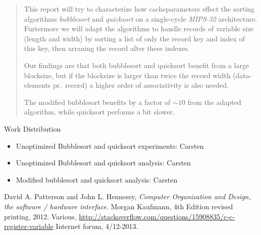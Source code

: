 



\begin{abstract}
This report will try to characterize how cacheparameters effect the sorting
algorithms \emph{bubblesort} and \emph{quicksort} on a single-cycle
\emph{MIPS-32} architecture.
Furtermore we will adapt the algorithms to handle records of variable size
(length and width) by sorting a list of only the record key and index of this
key, then arraning the record after these indexes.

Our findings are that both bubblesort and quicksort benefit from a large
blocksize, but if the blocksize is larger than twice the record width
(data-elements pr.\ record) a higher order of associativity is also needed.

The modified bubblesort benefits by a factor of $\sim10$ from the adapted
algorithm, while quicksort performs a bit slower.
\end{abstract}

\vspace{5cm}
Work Distribution
\begin{itemize}
	 \item Unoptimized Bubblesort and quicksort experiments: Carsten
	 \item Unoptimized Bubblesort and quicksort analysis: Carsten
	\item Modified bubblesort and quicksort analysis: Carsten
\end{itemize}

\newpage
\tableofcontents
\lstlistoflistings
\newpage







\begin{thebibliography}{9}

  David A. Patterson and John L. Hennessy,
  \emph{Computer Organization and Design, the software / hardware interface}.
  Morgan Kaufmann,
  4th Edition revised printing,
  2012.
  Various,
  \url{http://stackoverflow.com/questions/15908835/c-c-register-variable}
  Internet forum,
  4/12-2013.

\end{thebibliography}

